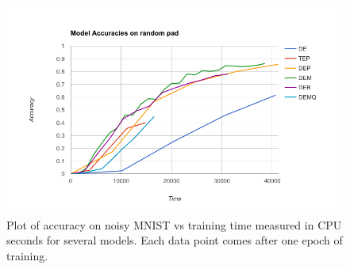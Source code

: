 
\begin{figure}
    \centering
    \includegraphics[scale=0.45]{resources/model_experiments.png}
    \caption{Plot of accuracy on noisy MNIST vs training time measured in CPU seconds for several models. Each data point comes after one epoch of training.}
    \label{fig:mnist_models}
\end{figure}
